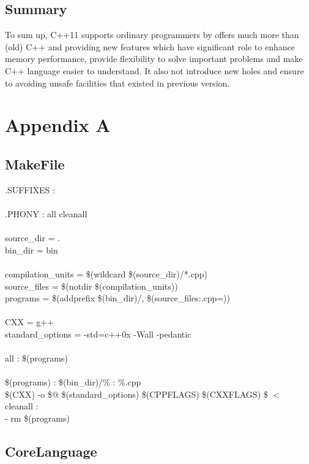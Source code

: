 \documentclass[11pt]{report}
\begin{document}
\section{Summary}
\label{section: summary}

To sum up, C++11 supports ordinary programmers by offers much more than (old) C++  and  providing new features which have significant role to enhance memory performance, provide flexibility to solve important problems and make C++ language easier to understand. It also not introduce new holes and  ensure to avoiding unsafe facilities that existed in previous version.


\label{References}

	


\appendix
\chapter{Appendix A}
\section{MakeFile}
\label{Makefile}
.SUFFIXES : \\ \\
.PHONY : all cleanall \\ \\
source\_dir = .\\ 
bin\_dir = bin \\ \\
compilation\_units = \$(wildcard \$(source\_dir)/*.cpp)\\
source\_files = \$(notdir \$(compilation\_units))\\
programs = \$(addprefix \$(bin\_dir)/, \$(source\_files:.cpp=))\\ \\
CXX = g++ \\
standard\_options = -std=c++0x -Wall -pedantic \\ \\
all : \$(programs)\\ \\
\$(programs) : \$(bin\_dir)/\% : \%.cpp \\
\$(CXX) -o \$@ \$(standard\_options) \$(CPPFLAGS) \$(CXXFLAGS) \$ $<$ \\

cleanall : \\
- rm \$(programs)

\section{CoreLanguage}
\label{Appendix: corelanguage}
\end{document}
